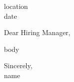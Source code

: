\documentclass[a4paper,10pt]{article}
\begin{document}
\begin{flushright}
{{ location }} \\
{{ date }}
\end{flushright}

\vspace{4em}

Dear Hiring Manager,


{{ body }}

\vspace{1.5em}

Sincerely, \\
{{ name }} \\
\end{document}
